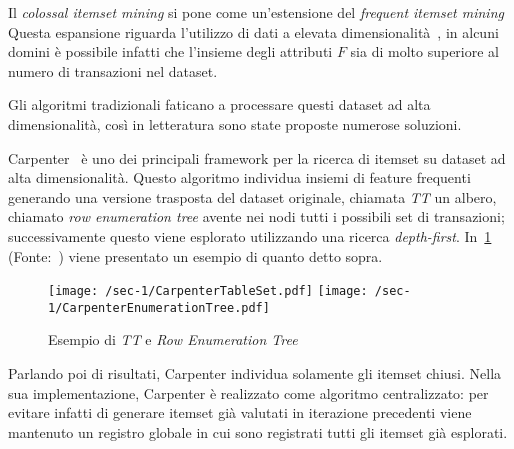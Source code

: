 
Il \textit{colossal itemset mining} si pone come un'estensione del \textit{frequent itemset mining}
Questa espansione riguarda l'utilizzo di dati
a elevata dimensionalità~\cite{zhu2007mining}, in alcuni domini è possibile infatti che l'insieme degli attributi \(F\) sia di molto superiore al
numero di transazioni nel dataset.

Gli algoritmi tradizionali faticano a processare questi dataset ad alta dimensionalità, così in
letteratura sono state proposte numerose soluzioni.

Carpenter~\cite{DBLP:conf/kdd/PanCTYZ03} è uno dei principali framework per
la ricerca di itemset su dataset ad alta dimensionalità.
Questo algoritmo individua insiemi di feature frequenti generando una versione trasposta del dataset originale, chiamata \textit{TT} un albero, chiamato \textit{row enumeration tree} avente nei nodi tutti i possibili set di transazioni;
successivamente questo viene esplorato utilizzando una ricerca \textit{depth-first}.
In~\cref{fig:chap-3:carpenter} (Fonte:~\cite{pan2003carpenter}) viene presentato un esempio di quanto detto sopra.

\begin{figure}
  \centering
  \texttt{[image: /sec-1/CarpenterTableSet.pdf]}
  \texttt{[image: /sec-1/CarpenterEnumerationTree.pdf]}
  \caption{Esempio di \textit{TT} e \textit{Row Enumeration Tree}}%
  \label{fig:chap-3:carpenter}
\end{figure}

Parlando poi di risultati, Carpenter individua solamente gli itemset chiusi.
Nella sua implementazione, Carpenter è realizzato come algoritmo centralizzato: per evitare infatti
di generare itemset già valutati in iterazione precedenti viene mantenuto un registro globale in
cui sono registrati tutti gli itemset già esplorati.
